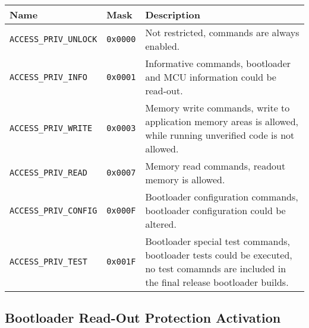 \begin{table*}[!ht]
  \hspace*{-4cm}
  \begin{tabular}{| p{4cm} | p{1.5cm} | p{8.5cm} | }
      \hline
      \rowcolor{SeaGreen3!30!} {\bf Name} & {\bf Mask} & {\bf Description} \\
      \hline
      \hline
      {\tt ACCESS\_PRIV\_UNLOCK} & {\tt 0x0000} & Not restricted, commands are always enabled.\\
      \hline
      {\tt ACCESS\_PRIV\_INFO} & {\tt 0x0001} & Informative commands, bootloader and MCU information could be read-out.\\
      \hline
      {\tt ACCESS\_PRIV\_WRITE} & {\tt 0x0003} & Memory write commands, write to application memory areas is allowed, while running unverified code is not allowed.\\
      \hline
      {\tt ACCESS\_PRIV\_READ} & {\tt 0x0007} & Memory read commands, readout memory is allowed.\\
      \hline
      {\tt ACCESS\_PRIV\_CONFIG} & {\tt 0x000F} & Bootloader configuration commands, bootloader configuration could be altered.\\
      \hline
      {\tt ACCESS\_PRIV\_TEST} & {\tt 0x001F} & Bootloader special test commands, bootloader tests could be executed, no test comamnds are included in the final release bootloader builds.\\
      \hline
  \end{tabular}
\end{table*}





\clearpage
\subsection{Bootloader Read-Out Protection Activation} \label{sec:security:ReadOutAct}

